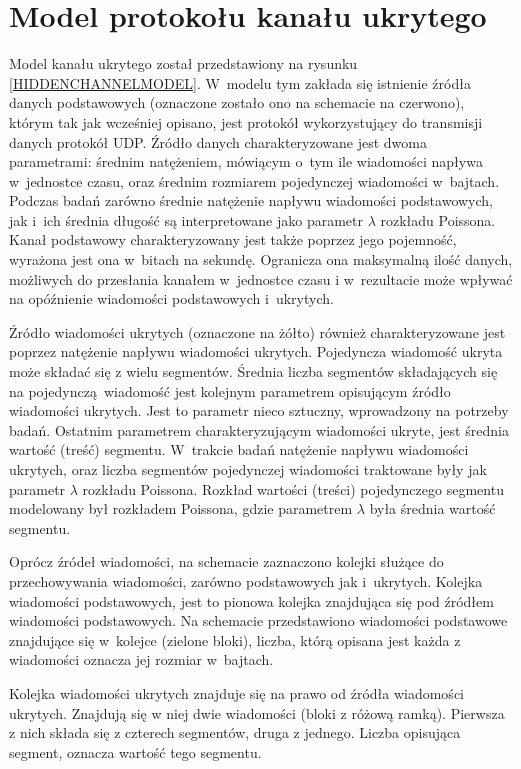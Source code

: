 \documentclass[a4paper, twoside, 12pt]{report}
\begin{document}
    \section{Model protokołu kanału ukrytego}

    Model kanału ukrytego został przedstawiony na rysunku \ref{HIDDENCHANNELMODEL}. W~modelu tym zakłada się
    istnienie źródła danych podstawowych (oznaczone zostało ono na schemacie na czerwono),
    którym tak jak wcześniej opisano, jest
    protokół wykorzystujący do transmisji danych protokół UDP. Źródło danych
    charakteryzowane jest dwoma parametrami: średnim natężeniem, mówiącym
    o~tym ile wiadomości napływa w~jednostce czasu, oraz średnim rozmiarem
    pojedynczej wiadomości w~bajtach. Podczas badań zarówno średnie natężenie napływu wiadomości
    podstawowych, jak i~ich średnia długość są interpretowane jako parametr \(\lambda \) rozkładu
    Poissona. Kanał podstawowy charakteryzowany jest także
    poprzez jego pojemność, wyrażona jest ona w~bitach na sekundę. Ogranicza ona
    maksymalną ilość danych, możliwych do przesłania kanałem w~jednostce czasu i
    w~rezultacie może wpływać na opóźnienie wiadomości podstawowych i~ukrytych.


    Źródło wiadomości ukrytych (oznaczone na żółto) również charakteryzowane jest poprzez natężenie
    napływu wiadomości ukrytych. Pojedyncza wiadomość ukryta może składać się z wielu
    segmentów. Średnia liczba segmentów składających się na pojedynczą wiadomość
    jest kolejnym parametrem opisującym źródło wiadomości ukrytych. Jest to parametr
    nieco sztuczny, wprowadzony na potrzeby badań. Ostatnim parametrem charakteryzującym
    wiadomości ukryte, jest średnia wartość (treść) segmentu. W~trakcie badań
    natężenie napływu wiadomości ukrytych, oraz liczba segmentów pojedynczej wiadomości
    traktowane były jak parametr \(\lambda \) rozkładu Poissona. Rozkład wartości (treści)
    pojedynczego segmentu modelowany był rozkładem Poissona, gdzie parametrem \(\lambda\) była
    średnia wartość segmentu.

    Oprócz źródeł wiadomości, na schemacie zaznaczono kolejki służące do przechowywania
    wiadomości, zarówno podstawowych jak i~ukrytych. Kolejka wiadomości podstawowych,
    jest to pionowa kolejka znajdująca się pod źródłem wiadomości podstawowych.
    Na schemacie przedstawiono wiadomości podstawowe znajdujące się w~kolejce (zielone bloki),
    liczba, którą opisana jest każda z wiadomości oznacza jej rozmiar w~bajtach.

    Kolejka wiadomości ukrytych znajduje się na prawo od źródła wiadomości ukrytych.
    Znajdują się w niej dwie wiadomości (bloki z różową ramką). Pierwsza z nich składa
    się z czterech segmentów, druga z jednego. Liczba opisująca segment, oznacza wartość tego segmentu.
\end{document}

